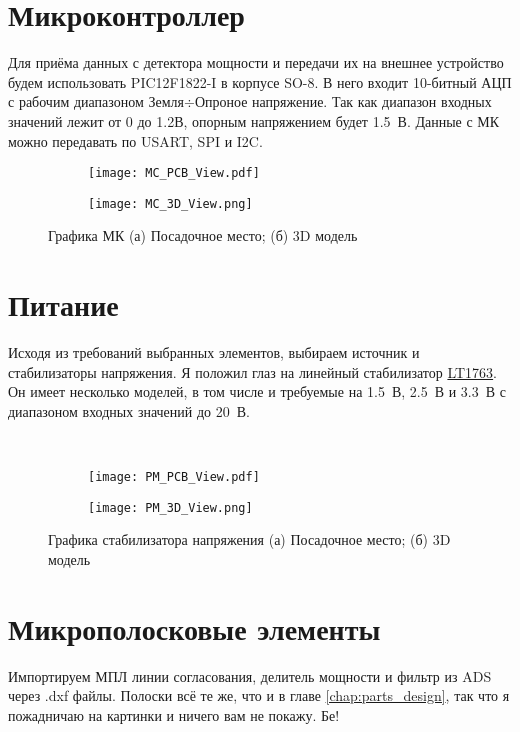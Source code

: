 \section{Микроконтроллер}

Для приёма данных с детектора мощности и передачи их на внешнее устройство будем использовать PIC12F1822-I в корпусе SO-8. В него входит 10-битный АЦП с рабочим диапазоном Земля$\div$Опроное напряжение. Так как диапазон входных значений лежит от 0 до 1.2В, опорным напряжением будет 1.5~В. Данные с МК можно передавать по USART, SPI и I2C.


\begin{figure}[H]
	\centering
	\begin{subfigure}[b]{0.45\textwidth}
		\centering
		\texttt{[image: MC\_PCB\_View.pdf]}
		\caption{}%
		\label{fig:MC_PCB_View}
	\end{subfigure}
	\hfill
	\begin{subfigure}[b]{0.45\textwidth}
		\centering
		\texttt{[image: MC\_3D\_View.png]}
		\caption{}%
		\label{fig:MC_3D_View}
	\end{subfigure}
	\caption{%
		Графика МК
		(а) Посадочное место;
		(б) 3D модель
	}%
	\label{fig:MC_footprint}
\end{figure}

\section{Питание}

Исходя из требований выбранных элементов, выбираем источник и стабилизаторы напряжения. Я положил глаз на линейный стабилизатор \href{https://www.analog.com/ru/products/lt1763.html}{LT1763}. Он имеет несколько моделей, в том числе и требуемые на 1.5~В, 2.5~В и 3.3~В с диапазоном входных значений до 20~В.

\begin{figure}[H]
	\centering\
	\begin{subfigure}[b]{0.45\textwidth}
		\centering
		\texttt{[image: PM\_PCB\_View.pdf]}
		\caption{}%
		\label{fig:PM_PCB_View}
	\end{subfigure}
	\hfill
	\begin{subfigure}[b]{0.45\textwidth}
		\centering
		\texttt{[image: PM\_3D\_View.png]}
		\caption{}%
		\label{fig:PM_3D_View}
	\end{subfigure}
	\caption{%
		Графика стабилизатора напряжения
		(а) Посадочное место;
		(б) 3D модель
	}%
	\label{fig:PM_footprint}
\end{figure}

\section*{Микрополосковые элементы}

Импортируем МПЛ линии согласования, делитель мощности и фильтр из ADS через .dxf файлы. 
Полоски всё те же, что и в главе \ref{chap:parts_design}, так что я пожадничаю на картинки и ничего вам не покажу. Бе!

